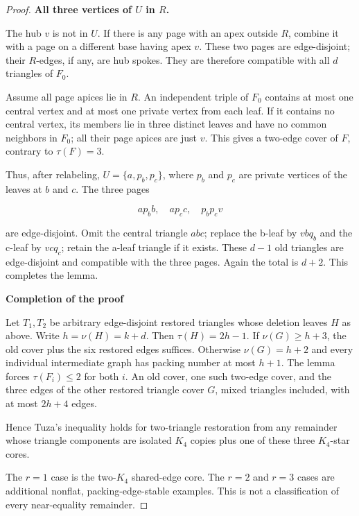 \documentclass[11pt]{article}
\theoremstyle{definition}\newtheorem{definition}[theorem]{Definition}
\theoremstyle{remark}\newtheorem{remark}[theorem]{Remark}
\begin{document}
\begin{proof}
\par\medskip\noindent\textbf{All three vertices of \(U\) in \(R\).}\label{all-three-vertices-of-u-in-r}

The hub \(v\) is not in \(U\). If there is any page with an apex outside \(R\), combine it with a page on a different base having apex \(v\). These two pages are edge-disjoint; their \(R\)-edges, if any, are hub spokes. They are therefore compatible with all \(d\) triangles of \(F_0\).

Assume all page apices lie in \(R\). An independent triple of \(F_0\) contains at most one central vertex and at most one private vertex from each leaf. If it contains no central vertex, its members lie in three distinct leaves and have no common neighbors in \(F_0\); all their page apices are just \(v\). This gives a two-edge cover of \(F\), contrary to \(\tau(F)=3\).

Thus, after relabeling, \(U=\{a,p_b,p_c\}\), where \(p_b\) and \(p_c\) are private vertices of the leaves at \(b\) and \(c\). The three pages

\begin{equation}
a p_b b,\quad a p_c c,\quad p_b p_c v
\end{equation}

are edge-disjoint. Omit the central triangle \(abc\); replace the b-leaf by \(vbq_b\) and the c-leaf by \(vcq_c\); retain the a-leaf triangle if it exists. These \(d-1\) old triangles are edge-disjoint and compatible with the three pages. Again the total is \(d+2\). This completes the lemma.

\par\medskip\noindent\textbf{Completion of the proof}\label{completion-of-the-proof}

Let \(T_1,T_2\) be arbitrary edge-disjoint restored triangles whose deletion leaves \(H\) as above. Write \(h=\nu(H)=k+d\). Then \(\tau(H)=2h-1\). If \(\nu(G)\ge h+3\), the old cover plus the six restored edges suffices. Otherwise \(\nu(G)=h+2\) and every individual intermediate graph has packing number at most \(h+1\). The lemma forces \(\tau(F_i)\le 2\) for both \(i\). An old cover, one such two-edge cover, and the three edges of the other restored triangle cover \(G\), mixed triangles included, with at most \(2h+4\) edges.

Hence Tuza's inequality holds for two-triangle restoration from any remainder whose triangle components are isolated \(K_4\) copies plus one of these three \(K_4\)-star cores.

The \(r=1\) case is the two-\(K_4\) shared-edge core. The \(r=2\) and \(r=3\) cases are additional nonflat, packing-edge-stable examples. This is not a classification of every near-equality remainder.
\end{proof}
\end{document}

